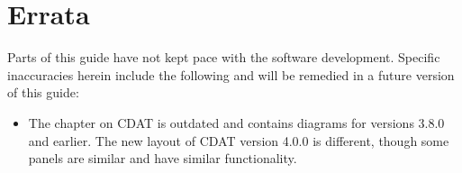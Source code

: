 \chapter*{Errata}

Parts of this guide have not kept pace with the software development.
Specific inaccuracies herein include the following and will be remedied in
a future version of this guide:
\begin{itemize}

  \item The chapter on CDAT is outdated and contains diagrams for versions
  3.8.0 and earlier.  The new layout of CDAT version 4.0.0 is different, 
  though some panels are similar and have similar functionality.


\end{itemize}

\thispagestyle{empty}

\newpage
